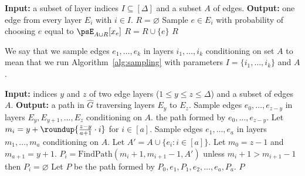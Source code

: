 \documentclass[11pt,a4paper]{article}
\begin{document}
\begin{algorithm}[H]
\caption{Edge sampling procedure}\label{alg:sampling}
\begin{algorithmic}[1]
\State \textbf{Input:} a subset of layer indices $I\subseteq[\Delta]$ and a subset $A$ of edges.
\State \textbf{Output:} one edge from every layer $E_i$ with $i\in I$.
\State $R = \varnothing$
    \State Sample $e\in E_i$ with probability of choosing $e$ equal to $\psE_{A\cup R}[x_e]$
    \State $R = R\cup \{e\}$
\EndFor
\State \Return $R$
\end{algorithmic}
\end{algorithm}

 We say that we sample edges $e_1,\dots, e_k$ in layers $i_1,\dots, i_k$ conditioning on set $A$ to mean that we run Algorithm~\ref{alg:sampling} with parameters $I = \{i_1,\dots,i_k\}$ and $A$.

\begin{algorithm}[H]
\caption{Rounding algorithm for layered graphs}\label{alg:rounding-general}
\begin{algorithmic}[1]
\State \textbf{Input:} indices $y$ and $z$ of two edge layers ($1\leq y\leq z\leq \Delta$) and a subset of edges $A$.
\State \textbf{Output:} a path in $\hat G$ traversing layers $E_y$ to $E_z$.
    \State Sample edges $e_0, \dots, e_{z-y}$ in layers $E_y, E_{y+1},\dots, E_z$ conditioning on $A$. 
    \State\Return the path formed by $e_0,\dots, e_{z-y}$.
\EndIf
\State Let $m_i = y + \roundup{\frac{z-y}{a+1}\cdot i}$ for $i\in[a]$.
\State Sample edges $e_1,\dots, e_{a}$ in layers $m_1,\dots, m_a$ conditioning on $A$.
\State  Let $A' = A \cup \{e_{i}:i\in [a]\}$.\label{alg_line:random_a_p}
\State Let $m_0 = z-1$ and $m_{a+1} = y+1$.
    \State $P_i = \mathrm{FindPath}(m_i+1, m_{i+1}-1, A')$ unless $m_i+1 > m_{i+1}-1$ then $P_i=\varnothing$
\EndFor
\State Let $P$ be the path formed by $P_0,e_1, P_1, e_2,\dots, e_a,P_a$.
\State \Return \(P\)\label{alg_line:rounding_sp_return_layered}
\EndFunction
\end{algorithmic}
\end{algorithm}
\end{document}
